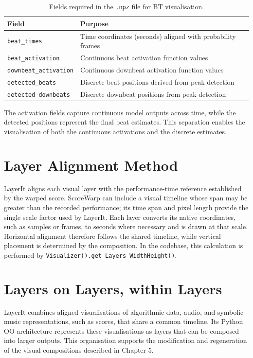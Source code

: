 \begin{table}[h]
\centering
\begin{tabular}{ll}
\hline
\textbf{Field} & \textbf{Purpose} \\
\hline
\texttt{beat\_times} & Time coordinates (seconds) aligned with probability frames \\
\texttt{beat\_activation} & Continuous beat activation function values \\
\texttt{downbeat\_activation} & Continuous downbeat activation function values \\
\texttt{detected\_beats} & Discrete beat positions derived from peak detection \\
\texttt{detected\_downbeats} & Discrete downbeat positions from peak detection \\
\hline
\end{tabular}
\caption[Required .npz fields]{Fields required in the \texttt{.npz} file for BT visualisation.}
\label{tab:npzStructure}
\end{table}

The activation fields capture continuous model outputs across time, while the detected positions represent the final beat estimates. This separation enables the visualisation of both the continuous activations and the discrete estimates.

\section{Layer Alignment Method}
LayerIt aligns each visual layer with the performance-time reference established by the warped score. ScoreWarp can include a visual timeline whose span may be greater than the recorded performance; its time span and pixel length provide the single scale factor used by LayerIt. Each layer converts its native coordinates, such as samples or frames, to seconds where necessary and is drawn at that scale. Horizontal alignment therefore follows the shared timeline, while vertical placement is determined by the composition. In the codebase, this calculation is performed by \texttt{Visualizer().get\_Layers\_WidthHeight()}.

\section{Layers on Layers, within Layers}
LayerIt combines aligned visualisations of algorithmic data, audio, and symbolic music representations, such as scores, that share a common timeline. Its Python OO architecture represents these visualisations as layers that can be composed into larger outputs. This organisation supports the modification and regeneration of the visual compositions described in Chapter 5.

